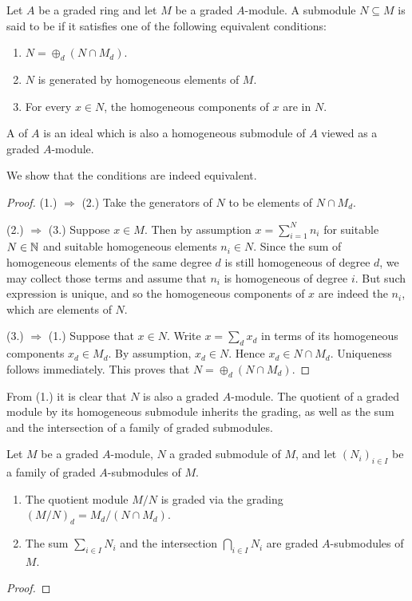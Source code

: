 \begin{definition}
	Let $A$ be a graded ring and let $M$ be a graded $A$-module. A submodule $N \subseteq M$ is said to be  if it satisfies one of the following equivalent conditions:
	\begin{enumerate}
		\item $N = \oplus_{d} (N \cap M_d)$.
		\item $N$ is generated by homogeneous elements of $M$.
		\item For every $x \in N$, the homogeneous components of $x$ are in $N$.
	\end{enumerate}
	
	A  of $A$ is an ideal which is also a homogeneous submodule of $A$ viewed as a graded $A$-module.
\end{definition}

We show that the conditions are indeed equivalent.
\begin{proof}
	(1.) $\Rightarrow$ (2.) Take the generators of $N$ to be elements of $N \cap M_d$.
	
	(2.) $\Rightarrow$ (3.) Suppose $x \in M$. Then by assumption $x = \sum_{i = 1}^N n_i$ for suitable $N \in \mathbb N$ and suitable homogeneous elements $n_i \in N$. Since the sum of homogeneous elements of the same degree $d$ is still homogeneous of degree $d$, we may collect those terms and assume that $n_i$ is homogeneous of degree $i$. But such expression is unique, and so the homogeneous components of $x$ are indeed the $n_i$, which are elements of $N$.
	
	(3.) $\Rightarrow$ (1.) Suppose that $x \in N$. Write $x = \sum_d x_d$ in terms of its homogeneous components $x_d \in M_d$. By assumption, $x_d \in N$. Hence $x_d \in N \cap M_d$. Uniqueness follows immediately. This proves that $N = \oplus_{d} (N \cap M_d)$.
\end{proof}

From (1.) it is clear that $N$ is also a graded $A$-module.	The quotient of a graded module by its homogeneous submodule inherits the grading, as well as the sum and the intersection of a family of graded submodules.

\begin{proposition}
	Let $M$ be a graded $A$-module, $N$ a graded submodule of $M$, and let $(N_i)_{i \in I}$ be a family of graded $A$-submodules of $M$. 
	\begin{enumerate}
		\item The quotient module $M/N$ is graded via the grading $(M/N)_d = M_d/(N \cap M_d)$.
		
		\item The sum $\sum_{i \in I} N_i$ and the intersection $\bigcap_{i \in I} N_i$ are graded $A$-submodules of $M$.
	\end{enumerate}
\end{proposition}
\begin{proof}
\end{proof}

